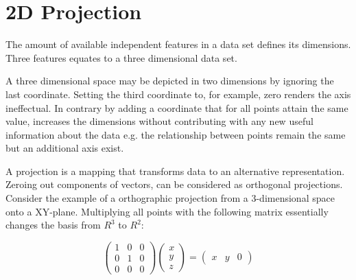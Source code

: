 \documentclass[a4paper,twoside]{bth}
\begin{document}



\section{2D Projection}

\par The amount of available independent features in a data set defines its dimensions\cite{Belkin:2003:LED:795523.795528}. Three features equates to a three dimensional data set. 
\par A three dimensional space may be depicted in two dimensions by ignoring the last coordinate. Setting the third coordinate to, for example, zero renders the axis ineffectual.  In contrary by adding a coordinate that for all points attain the same value, increases the dimensions without contributing with any new useful information about the data e.g. the relationship between points remain the same but an additional axis exist.

\par A projection is a mapping that transforms data to an alternative representation. Zeroing out components of vectors, can be considered as orthogonal projections. Consider the example of a orthographic projection from a 3-dimensional space onto a XY-plane. Multiplying all points with the following matrix essentially changes the basis from $R^3$ to $R^2$: 

\begin{equation}\label{eq:orthogonalproj}
{
\left({\begin{array}{ccc} 1 & 0 & 0\\ 0 & 1 & 0\\ 0 & 0 & 0 \end{array}}\right) 
\left({\begin{array}{c} x \\ y \\ z \end{array}}\right) =
\left(\begin{array}{ccc} x & y & 0 \end{array}\right) 
}
\end{equation}
\end{document}
